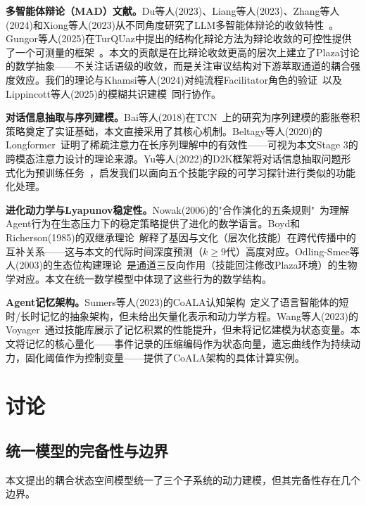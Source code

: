 \documentclass[twocolumn,10.5pt]{ctexart}
\begin{document}
\textbf{多智能体辩论（MAD）文献。}Du等人(2023)、Liang等人(2023)、Zhang等人(2024)和Xiong等人(2023)从不同角度研究了LLM多智能体辩论的收敛特性~\cite{du2023improving,liang2023encouraging,zhang2024reconcile,xiong2023dubi}。Gungor等人(2025)在TurQUaz中提出的结构化辩论方法为辩论收敛的可控性提供了一个可测量的框架~\cite{gungor2025turquaz}。本文的贡献是在比辩论收敛更高的层次上建立了Plaza讨论的数学抽象——不关注话语级的收敛，而是关注审议结构对下游萃取通道的耦合强度效应。我们的理论与Khamsi等人(2024)对纯流程Facilitator角色的验证~\cite{khamsi2024focus}以及Lippincott等人(2025)的模糊共识建模~\cite{lippincott2025fuzzy}同行协作。

\textbf{对话信息抽取与序列建模。}Bai等人(2018)在TCN~\cite{bai2018tcn}上的研究为序列建模的膨胀卷积策略奠定了实证基础，本文直接采用了其核心机制。Beltagy等人(2020)的Longformer~\cite{beltagy2020longformer}证明了稀疏注意力在长序列理解中的有效性——可视为本文Stage 3的跨模态注意力设计的理论来源。Yu等人(2022)的D2K框架将对话信息抽取问题形式化为预训练任务~\cite{yu2022d2k}，启发我们以面向五个技能字段的可学习探针进行类似的功能化处理。

\textbf{进化动力学与Lyapunov稳定性。}Nowak(2006)的"合作演化的五条规则"~\cite{nowak2006five}为理解Agent行为在生态压力下的稳定策略提供了进化的数学语言。Boyd和Richerson(1985)的双继承理论~\cite{boyd1985culture}解释了基因与文化（层次化技能）在跨代传播中的互补关系——这与本文的代际时间深度预测（$k\geq 9$代）高度对应。Odling-Smee等人(2003)的生态位构建理论~\cite{odling2003niche}是通道三反向作用（技能回注修改Plaza环境）的生物学对应。本文在统一数学模型中体现了这些行为的数学结构。

\textbf{Agent记忆架构。}Sumers等人(2023)的CoALA认知架构~\cite{sumers2023coala}定义了语言智能体的短时/长时记忆的抽象架构，但未给出矢量化表示和动力学方程。Wang等人(2023)的Voyager~\cite{wang2023voyager}通过技能库展示了记忆积累的性能提升，但未将记忆建模为状态变量。本文将记忆的核心量化——事件记录的压缩编码作为状态向量，遗忘曲线作为持续动力，固化阈值作为控制变量——提供了CoALA架构的具体计算实例。

\section{讨论}

\subsection{统一模型的完备性与边界}

本文提出的耦合状态空间模型统一了三个子系统的动力建模，但其完备性存在几个边界。
\end{document}
